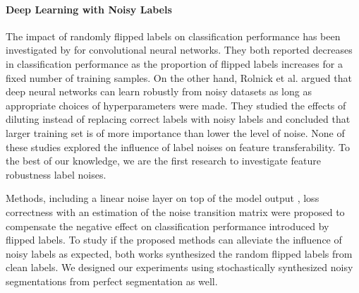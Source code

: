 
\paragraph{Deep Learning with Noisy Labels}

The impact of randomly flipped labels on classification performance has been investigated by \cite{sukhbaatar2014training,patrini2016making} for convolutional neural networks.
They both reported decreases in classification performance as the proportion of flipped labels increases for a fixed number of training samples.
On the other hand, Rolnick et al. \cite{rolnick2017deep} argued that deep neural networks can learn robustly from noisy datasets as long as appropriate choices of hyperparameters were made.
They studied the effects of diluting instead of replacing correct labels with noisy labels and concluded that larger training set is of more importance than lower the level of noise.
None of these studies explored the influence of label noises on feature transferability.
To the best of our knowledge, we are the first research to investigate feature robustness label noises.

Methods, including a linear noise layer on top of the model output \cite{sukhbaatar2014training}, loss correctness with an estimation of the noise transition matrix \cite{patrini2016making} were proposed to compensate the negative effect on classification performance introduced by flipped labels.
To study if the proposed methods can alleviate the influence of noisy labels as expected, both works synthesized the random flipped labels from clean labels.
We designed our experiments using stochastically synthesized noisy segmentations from perfect segmentation as well.


